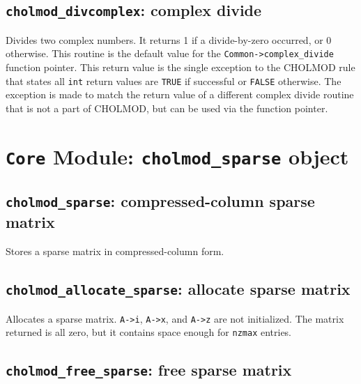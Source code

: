 \documentclass[11pt]{article}
\begin{document}
\subsection{{\tt cholmod\_divcomplex}: complex divide}


Divides two complex numbers.  It returns 1 if a divide-by-zero occurred, or 0 otherwise.
This routine is the default value for the {\tt Common->complex\_divide} function pointer.
This return value is the single exception to the CHOLMOD rule that states all {\tt int} return
values are {\tt TRUE} if successful or {\tt FALSE} otherwise.
The exception is made to match the return value of a different complex divide routine
that is not a part of CHOLMOD, but can be used via the function pointer.

\newpage \section{{\tt Core} Module: {\tt cholmod\_sparse} object}
\label{cholmod_sparse}

\subsection{{\tt cholmod\_sparse}: compressed-column sparse matrix}


Stores a sparse matrix in compressed-column form.

\newpage \subsection{{\tt cholmod\_allocate\_sparse}: allocate sparse matrix}


Allocates a sparse matrix.  {\tt A->i}, {\tt A->x}, and {\tt A->z} are not initialized.
The matrix returned is all zero, but it contains space enough for {\tt nzmax} entries.

\subsection{{\tt cholmod\_free\_sparse}: free sparse matrix}
\end{document}
